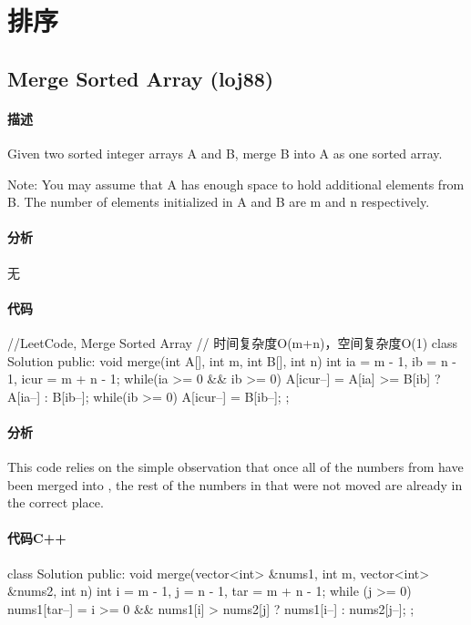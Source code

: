\chapter{排序}

\section{Merge Sorted Array (loj88)} %
\label{sec:merge-sorted-array}


\subsubsection{描述}
Given two sorted integer arrays A and B, merge B into A as one sorted array.

Note:
You may assume that A has enough space to hold additional elements from B. The number of elements initialized in A and B are m and n respectively.


\subsubsection{分析}
无


\subsubsection{代码}
\begin{Code}
//LeetCode, Merge Sorted Array
// 时间复杂度O(m+n)，空间复杂度O(1)
class Solution {
public:
    void merge(int A[], int m, int B[], int n) {
        int ia = m - 1, ib = n - 1, icur = m + n - 1;
        while(ia >= 0 && ib >= 0) {
            A[icur--] = A[ia] >= B[ib] ? A[ia--] : B[ib--];
        }
        while(ib >= 0) {
            A[icur--] = B[ib--];
        }
    }
};
\end{Code}

\subsubsection{分析}
This code relies on the simple observation that once all of the numbers from  have been merged into , the rest of the numbers in  that were not moved are already in the correct place.

\subsubsection{代码C++}
\begin{Code}
class Solution {
public:
    void merge(vector<int> &nums1, int m, vector<int> &nums2, int n) {
        int i = m - 1, j = n - 1, tar = m + n - 1;
        while (j >= 0) {
            nums1[tar--] = i >= 0 && nums1[i] > nums2[j] ? nums1[i--] : nums2[j--];
        }
    }
};
\end{Code}


